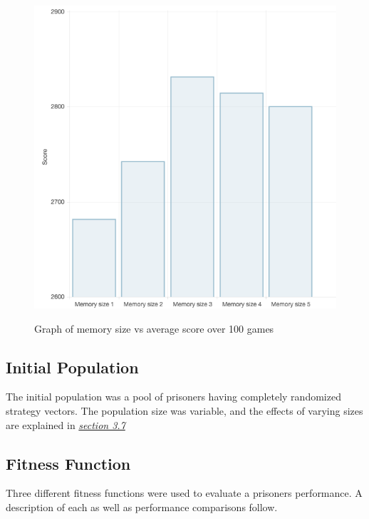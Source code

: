 \documentclass[12pt]{article}
\begin{document}
\begin{figure}[h]
    \caption{Graph of memory size vs average score over 100 games}
    \centering
    \includegraphics[scale=0.6]{figures/memsize-vs-score.png}
    \label{fig1}
\end{figure}

\subsection{Initial Population}
The initial population was a pool of prisoners having completely randomized
strategy vectors.  The population size was variable, and the effects of varying
sizes are explained in \textit{\hyperref[vpg]{section 3.7}}

\subsection{Fitness Function}

Three different fitness functions were used to evaluate a prisoners performance.
A description of each as well as performance comparisons follow.
\end{document}

